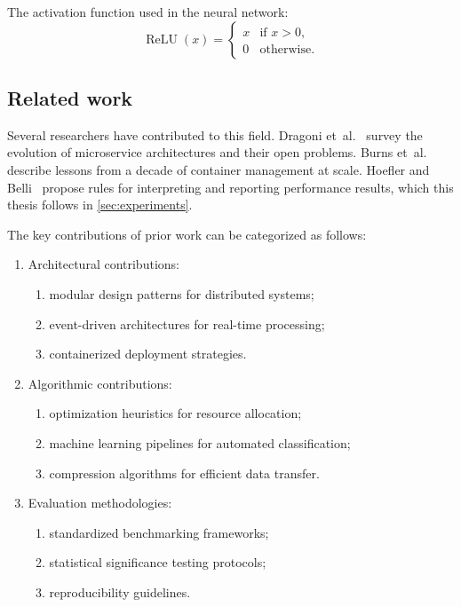 The activation function used in the neural network:
\begin{equation}\label{eq:relu}
  \operatorname{ReLU}(x) =
  \begin{cases}
    x & \text{if } x > 0, \\
    0 & \text{otherwise.}
  \end{cases}
\end{equation}

\subsection{Related work}

Several researchers have contributed to this field.
Dragoni et~al.~\cite{dragoni2017microservices} survey the evolution of microservice architectures and their open problems.
Burns et~al.~\cite{burns2016borg} describe lessons from a decade of container management at scale.
Hoefler and Belli~\cite{hoefler2015scientific} propose rules for interpreting and reporting performance results, which this thesis follows in \cref{sec:experiments}.

The key contributions of prior work can be categorized as follows:
\begin{enumerate}
  \item Architectural contributions:
    \begin{enumerate}
      \item modular design patterns for distributed systems;
      \item event-driven architectures for real-time processing;
      \item containerized deployment strategies.
    \end{enumerate}
  \item Algorithmic contributions:
    \begin{enumerate}
      \item optimization heuristics for resource allocation;
      \item machine learning pipelines for automated classification;
      \item compression algorithms for efficient data transfer.
    \end{enumerate}
  \item Evaluation methodologies:
    \begin{enumerate}
      \item standardized benchmarking frameworks;
      \item statistical significance testing protocols;
      \item reproducibility guidelines.
    \end{enumerate}
\end{enumerate}


